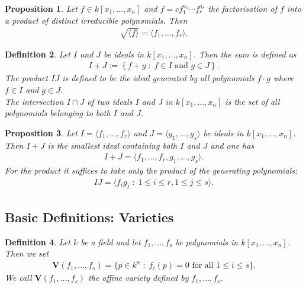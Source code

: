 \documentclass[11pt,a4paper,english]{scrartcl}
\newtheorem{defn}{Definition}
\newtheorem{prop}[defn]{Proposition}
\newcommand{\V}{\mathbf{V}}
\newcommand{\mvar}[2]{#1_1,\ldots , #1_{#2}}
\newcommand{\kxn}{k[\mvar{x}{n}]}
\begin{document}
\begin{prop}
Let $f\in \kxn$ and $f = c f_1^{a_1} \cdots f_r^{a_r}$ the factorisation of $f$ into a product of distinct irreducible polynomials. Then \begin{align*}
\sqrt{\langle f \rangle} = \langle \mvar{f}{r} \rangle .
\end{align*}
\end{prop}

\begin{defn}
Let $I $ and  $ J $ be ideals in $\kxn$. Then the \emph{sum} is defined as
\begin{align*}
I+J := \left\lbrace f+g \; :\; f\in I \text{ and } g \in J \right\rbrace .
\end{align*}
The \emph{product} $IJ$ is defined to be the ideal generated by all polynomials $f\cdot g$ where $f\in I$ and $g\in J$.\\
The \emph{intersection} $I\cap J$ of two ideals $I$ and $J$ in $\kxn$ is the set of all polynomials belonging to both $I$ and $J$.
\end{defn}

\begin{prop}
\label{propsuminters}
Let $I = \langle \mvar{f}{r} \rangle$ and  $ J = \langle \mvar{g}{s} \rangle$ be ideals in $\kxn$. Then $I+J$ is the smallest ideal containing both $I$ and $J$ and one has
\begin{align*}
I+J =\langle \mvar{f}{r} , \mvar{g}{s} \rangle .
\end{align*}
For the product it suffices to take only the product of the generating polynomials:
\begin{align*}
IJ =  \langle f_i g_j \; : \;  1\leq i\leq r , 1 \leq j \leq s\rangle . 
\end{align*}
\end{prop}

\subsection{Basic Definitions: Varieties}
\begin{defn} Let $k$ be a field and let $f_1, \ldots, f_s$ be polynomials in $k[x_1,\ldots,x_n]$. Then we set 
\begin{align*}
\V (\mvar{f}{s})  = \{ p \in k^n \; :\; f_i(p) = 0 \text{ for all } 1\leq i \leq s \} .
\end{align*}
We call $\V(\mvar{f}{s})$ the \emph{affine variety} defined by $\mvar{f}{s}$.
\end{defn}
\end{document}

